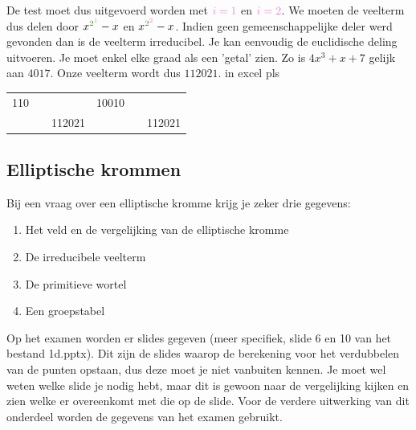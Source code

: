 \documentclass{article}
\def\warning#1{\color{red} #1 \color{black}}
\def\acca#1{\color{OliveGreen} #1 \color{black}}
\def\accb#1{\color{Lavender} #1 \color{black}}
\begin{document}
De test moet dus uitgevoerd worden met $\accb{i = 1}$ en $\accb{i = 2}$. We moeten de veelterm  dus delen door $x^{\acca{2}^{\accb{1}}} - x$ en $x^{\acca{2}^{\accb{2}}} - x$. Indien geen gemeenschappelijke deler werd gevonden dan is de veelterm irreducibel. Je kan eenvoudig de euclidische deling uitvoeren. Je moet enkel elke graad als een 'getal' zien. Zo is $4x^3 + x + 7$ gelijk aan $4017$. Onze veelterm wordt dus $112021$. \warning{in excel pls}
\begin{center}
\begin{tabular}{c c c | c c c}
 110 &  &        & 10010 &  &\\
     &  & 112021 &       &  & 112021
\end{tabular}
\end{center}



\subsection{Elliptische krommen}
Bij een vraag over een elliptische kromme krijg je zeker drie gegevens:
\begin{enumerate}
 \item Het veld en de vergelijking van de elliptische kromme
 \item De irreducibele veelterm
 \item De primitieve wortel
 \item Een groepstabel
\end{enumerate}

Op het examen worden er slides gegeven (meer specifiek, slide 6 en 10 van het bestand 1d.pptx). Dit zijn de slides waarop de berekening voor het verdubbelen van de punten opstaan, dus deze moet je niet  vanbuiten kennen. Je moet wel weten welke slide je nodig hebt, maar dit is gewoon naar de vergelijking kijken en zien welke er overeenkomt met die op de slide. Voor de verdere uitwerking van dit onderdeel worden de gegevens van het examen gebruikt.
\end{document}
